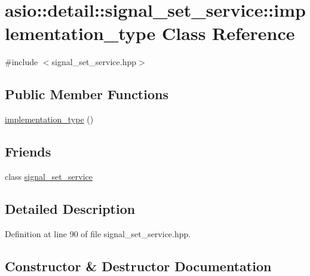 \hypertarget{classasio_1_1detail_1_1signal__set__service_1_1implementation__type}{}\section{asio\+:\+:detail\+:\+:signal\+\_\+set\+\_\+service\+:\+:implementation\+\_\+type Class Reference}
\label{classasio_1_1detail_1_1signal__set__service_1_1implementation__type}


{\ttfamily \#include $<$signal\+\_\+set\+\_\+service.\+hpp$>$}

\subsection*{Public Member Functions}
\begin{DoxyCompactItemize}
\item 
\hyperlink{classasio_1_1detail_1_1signal__set__service_1_1implementation__type_af73e2935be6e90e7ddd757542fc6c62d}{implementation\+\_\+type} ()
\end{DoxyCompactItemize}
\subsection*{Friends}
\begin{DoxyCompactItemize}
\item 
class \hyperlink{classasio_1_1detail_1_1signal__set__service_1_1implementation__type_a4c3a636c56d1c7da28cabb117a52300b}{signal\+\_\+set\+\_\+service}
\end{DoxyCompactItemize}


\subsection{Detailed Description}


Definition at line 90 of file signal\+\_\+set\+\_\+service.\+hpp.



\subsection{Constructor \& Destructor Documentation}
\hypertarget{classasio_1_1detail_1_1signal__set__service_1_1implementation__type_af73e2935be6e90e7ddd757542fc6c62d}{}

